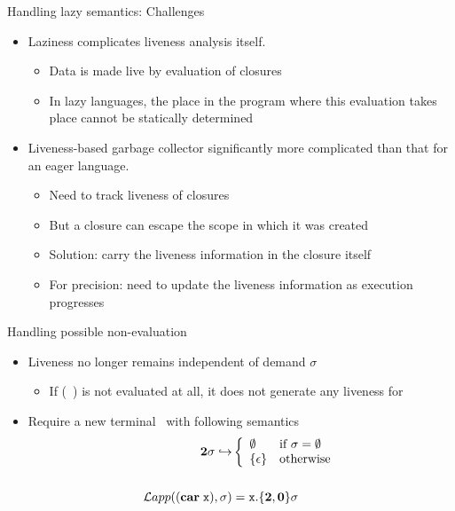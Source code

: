 \begin{frame}{Handling lazy semantics: Challenges}
\normalsize
  \begin{itemize}[<+->]\itemsep1em
  \item Laziness complicates liveness analysis itself. 
    \begin{itemize}
    \item Data is made live by evaluation of closures
    \item In lazy languages, the place in the program
      where this evaluation takes place cannot be statically determined
    \end{itemize}
   
  \item Liveness-based garbage collector significantly more complicated than that for an eager language.
    \begin{itemize}
    \item Need to track liveness of closures
    \item But a closure can escape the scope in which it was created
    \item Solution: carry the liveness information in the closure itself
    \item For precision: need to update the liveness information as execution progresses
    \end{itemize}
  \end{itemize}
\end{frame}

\begin{frame} {Handling possible non-evaluation}
  \begin{itemize}[<+->]
  \item Liveness no longer remains independent of demand $\sigma$ \\
    \begin{itemize}
    \item If (\CAR~\px) is not evaluated at all, it does not generate any liveness for \px
    \end{itemize}
  \item Require a new terminal \clazy\ with following semantics
    \begin{align*}
      {\mathbf{2}}\sigma \hookrightarrow & \left\{ 
      \begin{array}{ll}
        \emptyset&\mbox{if}~\sigma = \emptyset\\
        \{\epsilon\} & \mbox{otherwise}
      \end{array}\right.\\ & \\
      \mathcal{L}app((\mbox{$\mathbf{car}$} \;\mbox{\tt x}),\sigma) &= \mbox{\tt x}.\{{\mathbf{2}}, \mathbf{0}\}\sigma
    \end{align*}
  \end{itemize}
\end{frame}
